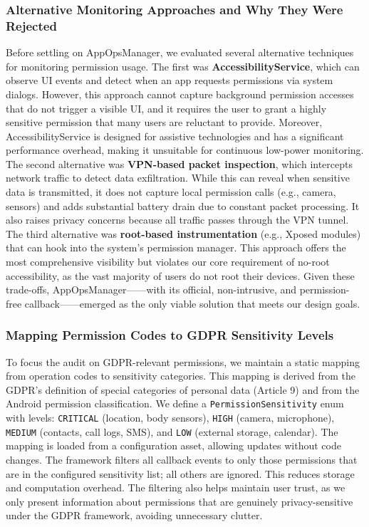 \subsubsection{Alternative Monitoring Approaches and Why They Were Rejected}

Before settling on AppOpsManager, we evaluated several alternative techniques for monitoring permission usage. The first was \textbf{AccessibilityService}, which can observe UI events and detect when an app requests permissions via system dialogs. However, this approach cannot capture background permission accesses that do not trigger a visible UI, and it requires the user to grant a highly sensitive permission that many users are reluctant to provide. Moreover, AccessibilityService is designed for assistive technologies and has a significant performance overhead, making it unsuitable for continuous low-power monitoring. The second alternative was \textbf{VPN-based packet inspection}, which intercepts network traffic to detect data exfiltration. While this can reveal when sensitive data is transmitted, it does not capture local permission calls (e.g., camera, sensors) and adds substantial battery drain due to constant packet processing. It also raises privacy concerns because all traffic passes through the VPN tunnel. The third alternative was \textbf{root-based instrumentation} (e.g., Xposed modules) that can hook into the system's permission manager. This approach offers the most comprehensive visibility but violates our core requirement of no-root accessibility, as the vast majority of users do not root their devices. Given these trade-offs, AppOpsManager——with its official, non-intrusive, and permission-free callback——emerged as the only viable solution that meets our design goals.

\subsubsection{Mapping Permission Codes to GDPR Sensitivity Levels}

To focus the audit on GDPR-relevant permissions, we maintain a static mapping from operation codes to sensitivity categories. This mapping is derived from the GDPR's definition of special categories of personal data (Article 9) and from the Android permission classification. We define a \texttt{PermissionSensitivity} enum with levels: \texttt{CRITICAL} (location, body sensors), \texttt{HIGH} (camera, microphone), \texttt{MEDIUM} (contacts, call logs, SMS), and \texttt{LOW} (external storage, calendar). The mapping is loaded from a configuration asset, allowing updates without code changes. The framework filters all callback events to only those permissions that are in the configured sensitivity list; all others are ignored. This reduces storage and computation overhead. The filtering also helps maintain user trust, as we only present information about permissions that are genuinely privacy-sensitive under the GDPR framework, avoiding unnecessary clutter.


